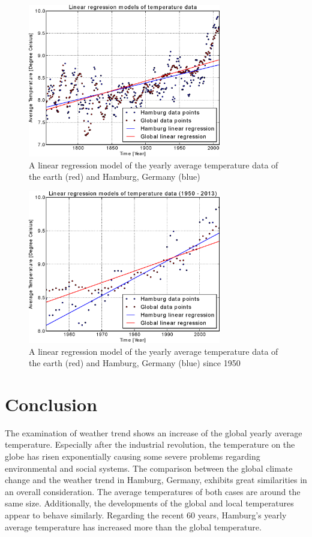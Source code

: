 \documentclass[a4paper]{article}
\begin{document}
\begin{figure}
\centering
\includegraphics[width=0.75\textwidth]{WeatherTrendsLinReg.eps}
\caption{\label{fig:LinReg}A linear regression model of the yearly average temperature data of the earth (red) and Hamburg, Germany (blue)}
\end{figure}

\begin{figure}
\centering
\includegraphics[width=0.75\textwidth]{WeatherTrendsLinReg1950.eps}
\caption{\label{fig:LinReg1950}A linear regression model of the yearly average temperature data of the earth (red) and Hamburg, Germany (blue) since 1950}
\end{figure}

\section{Conclusion}
The examination of weather trend shows an increase of the global yearly average temperature. Especially after the industrial revolution, the temperature on the globe has risen exponentially causing some severe problems regarding environmental and social systems. The comparison between the global climate change and the weather trend in Hamburg, Germany, exhibits great similarities in an overall consideration. The average temperatures of both cases are around the same size. Additionally, the developments of the global and local temperatures appear to behave similarly. Regarding the recent 60 years, Hamburg's yearly average temperature has increased more than the global temperature.  

%
%
\end{document}
